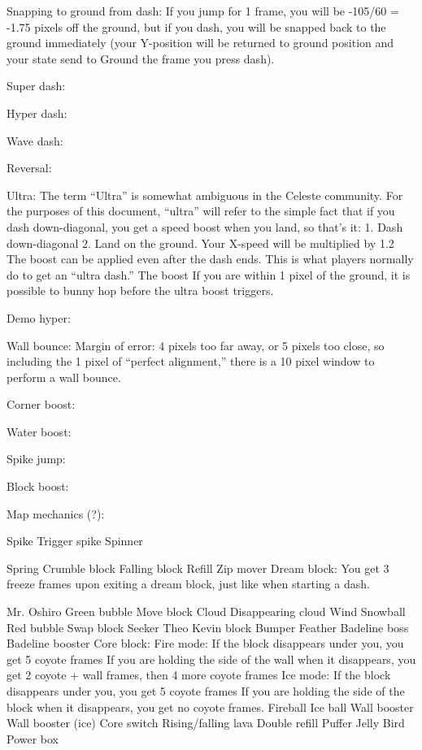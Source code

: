 \documentclass[oneside]{book}
\begin{document}
Snapping to ground from dash: If you jump for 1 frame, you will be -105/60 = -1.75 pixels off the ground, but if you dash, you will be snapped back to the ground immediately (your Y-position will be returned to ground position and your state send to Ground the frame you press dash).

Super dash:

Hyper dash:

Wave dash:

Reversal:

Ultra: The term “Ultra” is somewhat ambiguous in the Celeste community. For the purposes of this document, “ultra” will refer to the simple fact that if you dash down-diagonal, you get a speed boost when you land, so that's it:
1. Dash down-diagonal
2. Land on the ground. Your X-speed will be multiplied by 1.2
The boost can be applied even after the dash ends. This is what players normally do to get an “ultra dash.” The boost 
If you are within 1 pixel of the ground, it is possible to bunny hop before the ultra boost triggers.

Demo hyper:

Wall bounce:
Margin of error: 4 pixels too far away, or 5 pixels too close, so including the 1 pixel of “perfect alignment,” there is a 10 pixel window to perform a wall bounce.

Corner boost:

Water boost:

Spike jump:

Block boost:



Map mechanics  (?):

Spike
Trigger spike
Spinner

Spring
Crumble block
Falling block
Refill
Zip mover
Dream block:
You get 3 freeze frames upon exiting a dream block, just like when starting a dash.

Mr. Oshiro
Green bubble
Move block
Cloud
Disappearing cloud
Wind
Snowball
Red bubble
Swap block
Seeker
Theo
Kevin block
Bumper
Feather
Badeline boss
Badeline booster
Core block:
	Fire mode:
	If the block disappears under you, you get 5 coyote frames
	If you are holding the side of the wall when it disappears, you get 2 coyote + wall frames, then 	4 more coyote frames
	Ice mode:
	If the block disappears under you, you get 5 coyote frames
	If you are holding the side of the block when it disappears, you get no coyote frames.
Fireball
Ice ball
Wall booster
Wall booster (ice)
Core switch
Rising/falling lava
Double refill
Puffer
Jelly
Bird
Power box
\end{document}
